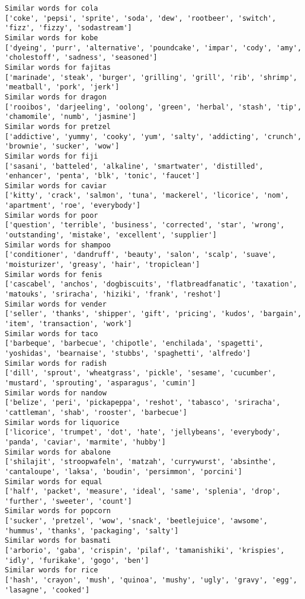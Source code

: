 \documentclass[11pt]{article}
\begin{document}
\begin{Verbatim}[commandchars=\\\{\}]
Similar words for cola
['coke', 'pepsi', 'sprite', 'soda', 'dew', 'rootbeer', 'switch', 'fizz', 'fizzy', 'sodastream']
Similar words for kobe
['dyeing', 'purr', 'alternative', 'poundcake', 'impar', 'cody', 'amy', 'cholestoff', 'sadness', 'seasoned']
Similar words for fajitas
['marinade', 'steak', 'burger', 'grilling', 'grill', 'rib', 'shrimp', 'meatball', 'pork', 'jerk']
Similar words for dragon
['rooibos', 'darjeeling', 'oolong', 'green', 'herbal', 'stash', 'tip', 'chamomile', 'numb', 'jasmine']
Similar words for pretzel
['addictive', 'yummy', 'cooky', 'yum', 'salty', 'addicting', 'crunch', 'brownie', 'sucker', 'wow']
Similar words for fiji
['sasani', 'batteled', 'alkaline', 'smartwater', 'distilled', 'enhancer', 'penta', 'blk', 'tonic', 'faucet']
Similar words for caviar
['kitty', 'crack', 'salmon', 'tuna', 'mackerel', 'licorice', 'nom', 'apartment', 'roe', 'everybody']
Similar words for poor
['question', 'terrible', 'business', 'corrected', 'star', 'wrong', 'outstanding', 'mistake', 'excellent', 'supplier']
Similar words for shampoo
['conditioner', 'dandruff', 'beauty', 'salon', 'scalp', 'suave', 'moisturizer', 'greasy', 'hair', 'tropiclean']
Similar words for fenis
['cascabel', 'anchos', 'dogbiscuits', 'flatbreadfanatic', 'taxation', 'matouks', 'sriracha', 'hiziki', 'frank', 'reshot']
Similar words for vender
['seller', 'thanks', 'shipper', 'gift', 'pricing', 'kudos', 'bargain', 'item', 'transaction', 'work']
Similar words for taco
['barbeque', 'barbecue', 'chipotle', 'enchilada', 'spagetti', 'yoshidas', 'bearnaise', 'stubbs', 'spaghetti', 'alfredo']
Similar words for radish
['dill', 'sprout', 'wheatgrass', 'pickle', 'sesame', 'cucumber', 'mustard', 'sprouting', 'asparagus', 'cumin']
Similar words for nandow
['belize', 'peri', 'pickapeppa', 'reshot', 'tabasco', 'sriracha', 'cattleman', 'shab', 'rooster', 'barbecue']
Similar words for liquorice
['licorice', 'trumpet', 'dot', 'hate', 'jellybeans', 'everybody', 'panda', 'caviar', 'marmite', 'hubby']
Similar words for abalone
['shilajit', 'stroopwafeln', 'matzah', 'currywurst', 'absinthe', 'cantaloupe', 'laksa', 'boudin', 'persimmon', 'porcini']
Similar words for equal
['half', 'packet', 'measure', 'ideal', 'same', 'splenia', 'drop', 'further', 'sweeter', 'count']
Similar words for popcorn
['sucker', 'pretzel', 'wow', 'snack', 'beetlejuice', 'awsome', 'hummus', 'thanks', 'packaging', 'salty']
Similar words for basmati
['arborio', 'gaba', 'crispin', 'pilaf', 'tamanishiki', 'krispies', 'idly', 'furikake', 'gogo', 'ben']
Similar words for rice
['hash', 'crayon', 'mush', 'quinoa', 'mushy', 'ugly', 'gravy', 'egg', 'lasagne', 'cooked']

\end{Verbatim}
\end{document}
